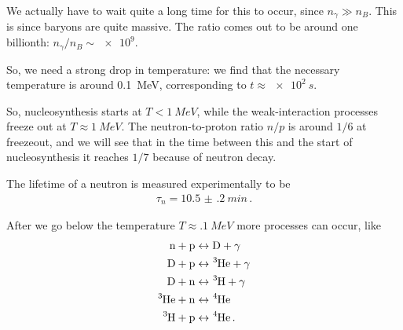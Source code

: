 \documentclass[main.tex]{subfiles}
\begin{document}
We actually have to wait quite a long time for this to occur, since \(n_{\gamma } \gg n_B\).
This is since baryons are quite massive. The ratio comes out to be around one billionth: \(n_\gamma / n_B \sim \num{e9}\).

So, we need a strong drop in temperature: we find that the necessary temperature is around \SI{0.1}{MeV}, corresponding to \(t \approx \SI{e2}{s}\). 

So, nucleosynthesis starts at \(T < \SI{1}{MeV}\), while the weak-interaction processes freeze out at \(T \approx \SI{1}{MeV}\). 
The neutron-to-proton ratio \(n/p\) is around \(1/6\) at freezeout, and we will see that in the time between this and the start of nucleosynthesis it reaches \(1/7\) because of neutron decay. 


The lifetime of a neutron is measured experimentally to be
%
\begin{align}
\tau_{n} = \SI{10.5(2)}{min}
\,.
\end{align}

%



After we go below the temperature \(T \approx \SI{.1}{MeV}\) more processes can occur, like 
%
\begin{align}
\ce{n}+ \ce{p} &\leftrightarrow \ce{D} + \gamma \\
\ce{D} + \ce{p} &\leftrightarrow \ce{^{3}He} + \gamma  \\
\ce{D} + \ce{n} &\leftrightarrow \ce{^{3}H} + \gamma  \\
\ce{^{3}He} + \ce{n} &\leftrightarrow \ce{^{4}He} \\
\ce{^{3}H} + \ce{p} &\leftrightarrow \ce{^{4}He} 
\,.
\end{align}
\end{document}
